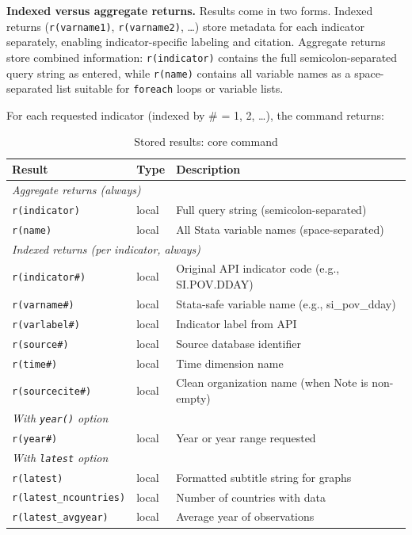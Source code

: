 \documentclass[bib]{statapress}
\begin{document}
\textbf{Indexed versus aggregate returns.} Results come in two forms. Indexed returns (\texttt{r(varname1)}, \texttt{r(varname2)}, \ldots) store metadata for each indicator separately, enabling indicator-specific labeling and citation. Aggregate returns store combined information: \texttt{r(indicator)} contains the full semicolon-separated query string as entered, while \texttt{r(name)} contains all variable names as a space-separated list suitable for \texttt{foreach} loops or variable lists.

For each requested indicator (indexed by \# = 1, 2, \ldots), the command returns:

\begin{table}[htbp]
\centering
\caption{Stored results: core command}
\label{tab:stored}
\begin{tabular}{llp{6.5cm}}
\hline
Result & Type & Description \\
\hline
\multicolumn{3}{l}{\textit{Aggregate returns (always)}} \\
\texttt{r(indicator)} & local & Full query string (semicolon-separated) \\
\texttt{r(name)} & local & All Stata variable names (space-separated) \\
\hline
\multicolumn{3}{l}{\textit{Indexed returns (per indicator, always)}} \\
\texttt{r(indicator\#)} & local & Original API indicator code (e.g., SI.POV.DDAY) \\
\texttt{r(varname\#)} & local & Stata-safe variable name (e.g., si\_pov\_dday) \\
\texttt{r(varlabel\#)} & local & Indicator label from API \\
\texttt{r(source\#)} & local & Source database identifier \\
\texttt{r(time\#)} & local & Time dimension name \\
\texttt{r(sourcecite\#)} & local & Clean organization name (when Note is non-empty) \\
\hline
\multicolumn{3}{l}{\textit{With \texttt{year()} option}} \\
\texttt{r(year\#)} & local & Year or year range requested \\
\hline
\multicolumn{3}{l}{\textit{With \texttt{latest} option}} \\
\texttt{r(latest)} & local & Formatted subtitle string for graphs \\
\texttt{r(latest\_ncountries)} & local & Number of countries with data \\
\texttt{r(latest\_avgyear)} & local & Average year of observations \\

\end{tabular}
\end{table}
\end{document}
